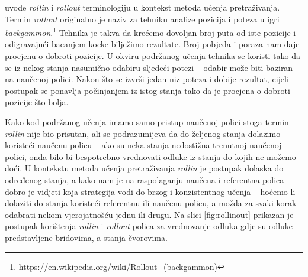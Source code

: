 \citet*{daume15lols} uvode \textit{rollin} i \textit{rollout} terminologiju u
kontekst metoda učenja pretraživanja. Termin \textit{rollout} originalno je
naziv za tehniku analize pozicija i poteza u igri
\textit{backgammon}.\footnote{\url{https://en.wikipedia.org/wiki/Rollout_(backgammon)}}
Tehnika je takva da krećemo dovoljan broj puta od iste pozicije i odigravajući
bacanjem kocke bilježimo rezultate. Broj pobjeda i poraza nam daje procjenu o
dobroti pozicije. U okviru podržanog učenja tehnika se koristi tako da se iz
nekog stanja nasumično odabiru sljedeći potezi -- odabir može biti baziran na
naučenoj polici. Nakon što se izvrši jedan niz poteza i dobije rezultat, cijeli
postupak se ponavlja počinjanjem iz istog stanja tako da je procjena o dobroti
pozicije što bolja.

Kako kod podržanog učenja imamo samo pristup naučenoj polici stoga termin
\textit{rollin} nije bio prisutan, ali se podrazumijeva da do željenog stanja
dolazimo koristeći naučenu policu -- ako su neka stanja nedostižna trenutnoj
naučenoj polici, onda bilo bi bespotrebno vrednovati odluke iz stanja do kojih
ne možemo doći. U kontekstu metoda učenja pretraživanja \textit{rollin} je
postupak dolaska do određenog stanja, a kako nam je na raspolaganju naučena i
referentna polica dobro je vidjeti koja strategija vodi do brzog i konzistentnog
učenja -- hoćemo li dolaziti do stanja koristeći referentnu ili naučenu policu,
a možda za svaki korak odabrati nekom vjerojatnošću jednu ili drugu. Na slici
\ref{fig:rollinout} prikazan je postupak korištenja \textit{rollin} i
\textit{rollout} polica za vrednovanje odluka gdje su odluke predstavljene
bridovima, a stanja čvorovima.

